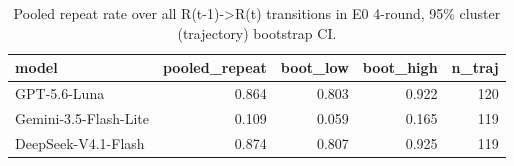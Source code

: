 \begin{table}[htbp]
\centering
\scriptsize
\caption{Pooled repeat rate over all R(t-1)->R(t) transitions in E0 4-round, 95\% cluster (trajectory) bootstrap CI.}
\label{tab:tab05_e0_4r_pooled_repeat}
\begin{tabular}{lrrrr}
\toprule
model & pooled\_repeat & boot\_low & boot\_high & n\_traj \\
\midrule
GPT-5.6-Luna & 0.864 & 0.803 & 0.922 & 120 \\
Gemini-3.5-Flash-Lite & 0.109 & 0.059 & 0.165 & 119 \\
DeepSeek-V4.1-Flash & 0.874 & 0.807 & 0.925 & 119 \\
\bottomrule
\end{tabular}
\end{table}